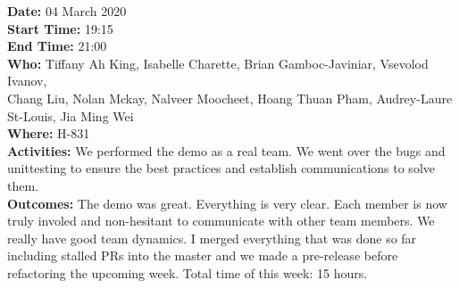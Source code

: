 \documentclass[12pt]{article}
\begin{document}
{\bf Date:} 04 March 2020\\
{\bf Start Time:} 19:15\\
{\bf End Time:} 21:00\\
{\bf Who:} Tiffany Ah King, Isabelle Charette, Brian Gamboc-Javiniar, Vsevolod Ivanov,\\
Chang Liu, Nolan Mckay, Nalveer Moocheet, Hoang Thuan Pham, Audrey-Laure St-Louis, Jia Ming Wei\\
{\bf Where:} H-831\\
{\bf Activities:} We performed the demo as a real team. We went over the bugs and unittesting to ensure the best practices and establish communications to solve them.\\
{\bf Outcomes:} The demo was great. Everything is very clear. Each member is now truly involed and non-hesitant to communicate with other team members. We really have good team dynamics. I merged everything that was done so far including stalled PRs into the master and we made a pre-release before refactoring the upcoming week. Total time of this week: 15 hours.\\

\end{document}
